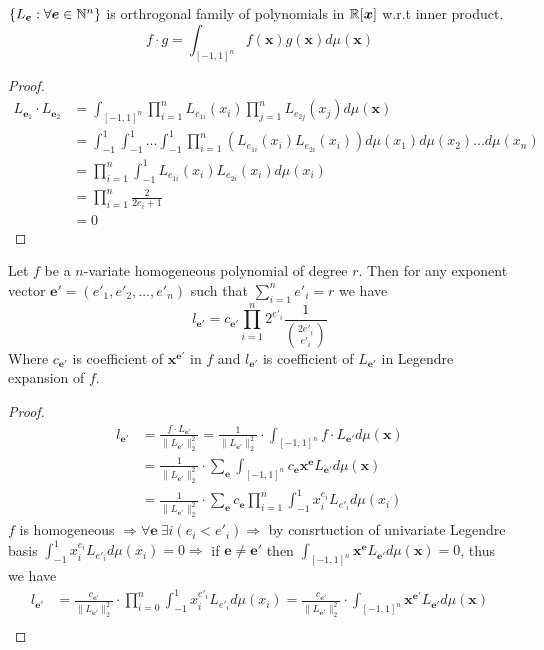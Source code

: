 {\thmpara
\begin{lemma}
$\{L_{\bm e}:\forall \bm e \in \mathbb{N}^n\}$ is orthrogonal family of polynomials in $\mathbb{R}[\bm x]$ w.r.t inner product.
$$
f\cdot g = \int_{[-1,1]^n}f(\bm x)g(\bm x)d\mu(\bm x)
$$
\end{lemma}
\begin{proof}
\begin{align*}
L_{\bm e_1}\cdot L_{\bm e_2} &=\int_{[-1,1]^n}\prod_{i=1}^{n}L_{e_{1i}}(x_i)\prod_{j=1}^{n}L_{e_{2j}}(x_j)d\mu(\bm x)\\&=\int_{-1}^1\int_{-1}^1...\int_{-1}^1\prod_{i=1}^n(L_{e_{1i}}(x_i)L_{e_{2i}}(x_i))d\mu(x_1)d\mu(x_2)...d\mu(x_n)\\&=\prod_{i=1}^n\int_{-1}^1L_{e_{1i}}(x_i)L_{e_{2i}}(x_i)d\mu(x_i)\\&=\prod_{i=1}^n\frac{2}{2e_{i}+1}\tag{$e_1=e_2=e$}\\&=0\tag{$e_1\ne e_2$}
\end{align*}
\end{proof}
\begin{lemma}
Let $f$ be a $n$-variate homogeneous polynomial of degree $r$. Then for any exponent vector $\bm e'=(e'_{1},e'_{2},...,e'_{n})$ such that $\sum_{i=1}^ne'_{i}=r$ we have
$$
l_{\bm e'} = c_{\bm e'}\prod_{i=1}^n2^{e'_{i}}\frac{1}{{2e'_{i} \choose e'_{i}}}
$$
Where $c_{\bm e'}$ is coefficient of $\bm x^{\bm e'}$ in $f$ and $l_{\bm e'}$ is coefficient of $L_{\bm e'}$ in Legendre expansion of $f$.
\end{lemma}
\begin{proof}
\begin{align*}
l_{\bm e'}&=\frac{f\cdot L_{\bm e'}}{\|L_{\bm e'}\|_2^2}=\frac{1}{\|L_{\bm e'}\|_2^2}\cdot \int_{[-1,1]^n}f\cdot L_{\bm e'}d\mu(\bm x)\\
&=\frac{1}{\|L_{\bm e'}\|_2^2}\cdot \sum_{\bm e}\int_{[-1,1]^n}c_{\bm e}\bm x^{\bm e}L_{\bm e'}d\mu(\bm x)\\
&=\frac{1}{\|L_{\bm e'}\|_2^2}\cdot \sum_{\bm e}c_{\bm e}\prod_{i=1}^n\int_{-1}^{1}x_i^{e_i}L_{e'_{i}}d\mu(x_i)
\end{align*}
$f$ is homogeneous $\Rightarrow \forall \bm e\ \exists i(e_i<e'_i)\Rightarrow $ by consrtuction of univariate Legendre basis $\int_{-1}^1x_i^{e_i}L_{e'_i}d\mu(x_i)=0 \Rightarrow$ if $\bm e \ne \bm e'$ then $\int_{[-1,1]^n} \bm x^{\bm e} L_{\bm e'}d\mu(\bm x)=0$, thus we have
\begin{align*}
l_{\bm e'}&=\frac{c_{\bm e'}}{\|L_{\bm e'}\|_2^2}\cdot \prod_{i=0}^{n} \int_{-1}^1 x_i^{e'_i}L_{e'_i}d\mu(x_i)= \frac{c_{\bm e'}}{\|L_{\bm e'}\|_2^2}\cdot \int_{[-1,1]^n}\bm x^{\bm e'}L_{\bm e'}d\mu(\bm x)\\

\end{align*}
\end{proof}}
